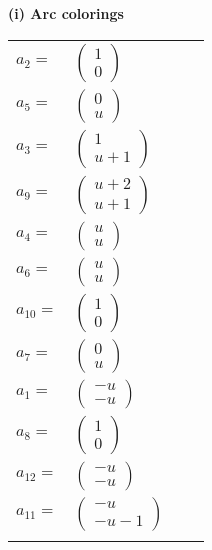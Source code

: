 \documentclass[1p]{elsarticle_modified}
\theoremstyle{definition}
\begin{document}
\flushleft \textbf{(i) Arc colorings}\\
\begin{tabular}{m{7pt} m{180pt} m{7pt} m{180pt} }
\flushright $a_{2}=$&$\begin{pmatrix}1\\0\end{pmatrix}$ \\
\flushright $a_{5}=$&$\begin{pmatrix}0\\u\end{pmatrix}$ \\
\flushright $a_{3}=$&$\begin{pmatrix}1\\u+1\end{pmatrix}$ \\
\flushright $a_{9}=$&$\begin{pmatrix}u+2\\u+1\end{pmatrix}$ \\
\flushright $a_{4}=$&$\begin{pmatrix}u\\u\end{pmatrix}$ \\
\flushright $a_{6}=$&$\begin{pmatrix}u\\u\end{pmatrix}$ \\
\flushright $a_{10}=$&$\begin{pmatrix}1\\0\end{pmatrix}$ \\
\flushright $a_{7}=$&$\begin{pmatrix}0\\u\end{pmatrix}$ \\
\flushright $a_{1}=$&$\begin{pmatrix}- u\\- u\end{pmatrix}$ \\
\flushright $a_{8}=$&$\begin{pmatrix}1\\0\end{pmatrix}$ \\
\flushright $a_{12}=$&$\begin{pmatrix}- u\\- u\end{pmatrix}$ \\
\flushright $a_{11}=$&$\begin{pmatrix}- u\\- u-1\end{pmatrix}$\\&\end{tabular}
\end{document}
